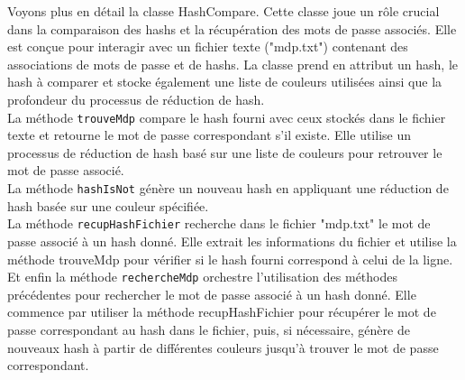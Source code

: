 \documentclass[a4paper,12pt]{article}
\begin{document}
Voyons plus en détail la classe HashCompare. Cette classe joue un rôle crucial dans la comparaison des hashs et la récupération des mots de passe associés. Elle est conçue pour interagir avec un fichier texte ("mdp.txt") contenant des associations de mots de passe et de hashs. La classe prend en attribut un hash, le hash à comparer et stocke également une liste de couleurs utilisées ainsi que la profondeur du processus de réduction de hash.\\ La méthode \texttt{trouveMdp} compare le hash fourni avec ceux stockés dans le fichier texte et retourne le mot de passe correspondant s'il existe. Elle utilise un processus de réduction de hash basé sur une liste de couleurs pour retrouver le mot de passe associé.\\ La méthode \texttt{hashIsNot} génère un nouveau hash en appliquant une réduction de hash basée sur une couleur spécifiée.\\ La méthode \texttt{recupHashFichier} recherche dans le fichier "mdp.txt" le mot de passe associé à un hash donné. Elle extrait les informations du fichier et utilise la méthode trouveMdp pour vérifier si le hash fourni correspond à celui de la ligne.\\ Et enfin la méthode \texttt{rechercheMdp} orchestre l'utilisation des méthodes précédentes pour rechercher le mot de passe associé à un hash donné. Elle commence par utiliser la méthode recupHashFichier pour récupérer le mot de passe correspondant au hash dans le fichier, puis, si nécessaire, génère de nouveaux hash à partir de différentes couleurs jusqu'à trouver le mot de passe correspondant.
\end{document}
